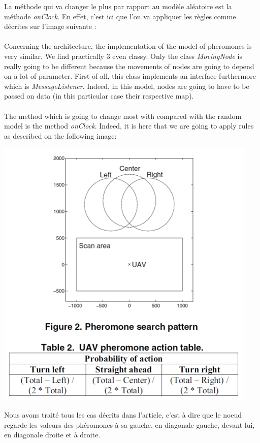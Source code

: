 La méthode qui va changer le plus par rapport au modèle aléatoire est la méthode \textit{onClock}. En effet, c'est ici que l'on va appliquer les règles comme décrites sur l'image suivante : \\\\

Concerning the architecture, the implementation of the model of pheromones is very similar. We find practically 3 even classy. Only the class \textit{MovingNode} is really going to be different because the movements of nodes are going to depend on a lot of parameter. First of all, this class implements an interface furthermore which is \textit{MessageListener}. Indeed, in this model, nodes are going to have to be passed on data (in this particular case their respective map). \\\\

The method which is going to change most with compared with the random model is the method \textit{onClock}. Indeed, it is here that we are going to apply rules as described on the following image:

\begin{center}
\includegraphics{../images/pheromon_model.png}
\end{center}

Nous avons traité tous les cas décrits dans l'article, c'est à dire que le noeud regarde les valeurs des phéromones à sa gauche, en diagonale gauche, devant lui, en diagonale droite et à droite.\\\\

